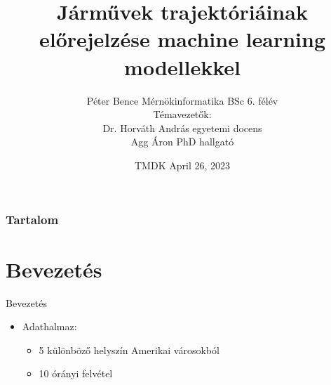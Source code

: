 \documentclass{beamer}
\title[Jármű trajektóriák előrejelzése]{Járművek trajektóriáinak előrejelzése machine learning modellekkel}
\author{Péter Bence Mérnökinformatika BSc 6. félév\\Témavezetők:\\Dr. Horváth András egyetemi docens\\Agg Áron PhD hallgató}
\institute{Széchenyi István University}
\date{TMDK April 26, 2023}
\begin{document}
\begin{frame}
\titlepage
\end{frame}

\begin{frame}
\frametitle{Tartalom}
\tableofcontents
\end{frame}

\section{Bevezetés}
\begin{frame}{Bevezetés}
    \begin{itemize}
        \item Adathalmaz: 
        \begin{itemize}
            \item 5 különböző helyszín Amerikai városokból
            \item 10 órányi felvétel
        \end{itemize}
    \end{itemize}
    \centering
\end{frame}
\end{document}
